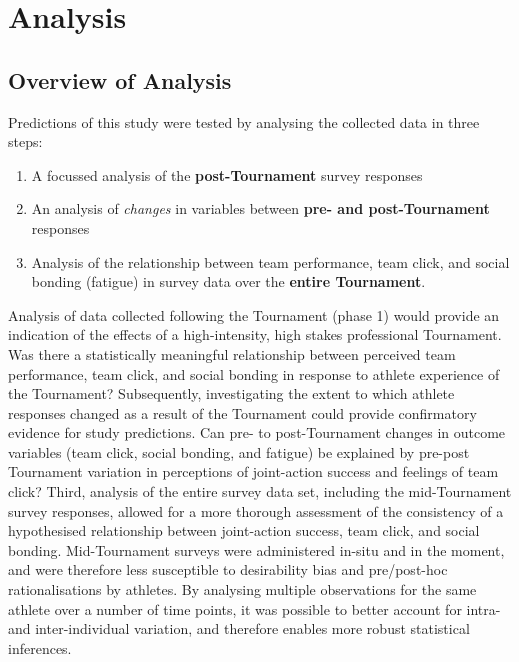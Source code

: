 \documentclass[12pt]{report}
\begin{document}
\clearpage
\section{Analysis}


\subsection{Overview of Analysis}

Predictions of this study were tested by analysing the collected data in three steps:\\

\begin{enumerate}
  \item A focussed analysis of the \textbf{post-Tournament} survey responses
  \item An analysis of \textit{changes} in variables between \textbf{pre- and post-Tournament} responses
  \item Analysis of the relationship between team performance, team click, and social bonding (fatigue) in survey data over the \textbf{entire Tournament}.
\end{enumerate}

Analysis of data collected following the Tournament (phase 1) would provide an indication of the effects of a high-intensity, high stakes professional Tournament. Was there a statistically meaningful relationship between perceived team performance, team click, and social bonding in response to athlete experience of the Tournament? Subsequently, investigating the extent to which athlete responses changed as a result of the Tournament could provide confirmatory evidence for study predictions. Can pre- to post-Tournament changes in outcome variables (team click, social bonding, and fatigue) be explained by pre-post Tournament variation in perceptions of joint-action success and feelings of team click? Third, analysis of the entire survey data set, including the mid-Tournament survey responses, allowed for a more thorough assessment of the consistency of a hypothesised relationship between joint-action success, team click, and social bonding. Mid-Tournament surveys were administered in-situ and in the moment, and were therefore less susceptible to desirability bias and pre/post-hoc rationalisations by athletes. By analysing multiple observations for the same athlete over a number of time points, it was possible to better account for intra- and inter-individual variation, and therefore enables more robust statistical inferences.
\end{document}
